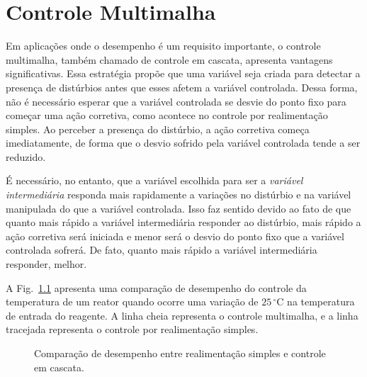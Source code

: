 
\chapter{Controle Multimalha}\label{controle}

	Em aplicações onde o desempenho é um requisito importante, o controle multimalha,
    também chamado de controle em cascata, apresenta vantagens significativas. Essa
    estratégia propõe que uma variável seja criada para detectar a presença de distúrbios
    antes que esses afetem a variável controlada. Dessa forma, não é necessário esperar
    que a variável controlada se desvie do ponto fixo para começar uma ação corretiva,
    como acontece no controle por realimentação simples. Ao perceber a presença do
    distúrbio, a ação corretiva começa imediatamente, de forma que o desvio sofrido pela
    variável controlada tende a ser reduzido.

    É necessário, no entanto, que a variável escolhida para ser a \emph{variável
    intermediária} responda mais rapidamente a variações no distúrbio e na variável
    manipulada do que a variável controlada. Isso faz sentido devido ao fato de que
    quanto mais rápido a variável intermediária responder ao distúrbio, mais rápido
    a ação corretiva será iniciada e menor será o desvio do ponto fixo que a variável
    controlada sofrerá. De fato, quanto mais rápido a variável intermediária responder,
    melhor.

    A Fig.~\ref{fig:controle_cascata} apresenta uma comparação de desempenho do controle
    da temperatura de um reator quando ocorre uma variação de $25\,^{\circ}\mathrm{C}$ na
    temperatura de entrada do reagente. A linha cheia representa o controle multimalha, e
    a linha tracejada representa o controle por realimentação simples.

    \begin{figure}[htb]
        \centering{
            \def\svgwidth{0.6\textwidth}
            }
        \renewcommand\figurename{Fig.}
        \caption{Comparação de desempenho entre realimentação simples e controle em
            cascata.}
        \label{fig:controle_cascata}
    \end{figure}

